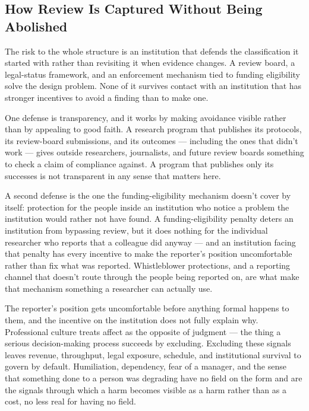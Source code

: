 \subsection{How Review Is Captured Without Being Abolished}
\label{sec:captured-abolished}
The risk to the whole structure is an institution that defends the classification it started with rather than revisiting it when evidence changes. A review board, a legal-status framework, and an enforcement mechanism tied to funding eligibility solve the design problem. None of it survives contact with an institution that has stronger incentives to avoid a finding than to make one.

One defense is transparency, and it works by making avoidance visible rather than by appealing to good faith. A research program that publishes its protocols, its review-board submissions, and its outcomes — including the ones that didn't work — gives outside researchers, journalists, and future review boards something to check a claim of compliance against. A program that publishes only its successes is not transparent in any sense that matters here.

A second defense is the one the funding-eligibility mechanism doesn't cover by itself: protection for the people inside an institution who notice a problem the institution would rather not have found. A funding-eligibility penalty deters an institution from bypassing review, but it does nothing for the individual researcher who reports that a colleague did anyway — and an institution facing that penalty has every incentive to make the reporter's position uncomfortable rather than fix what was reported. Whistleblower protections, and a reporting channel that doesn't route through the people being reported on, are what make that mechanism something a researcher can actually use.

The reporter's position gets uncomfortable before anything formal happens to them, and the incentive on the institution does not fully explain why. Professional culture treats affect as the opposite of judgment — the thing a serious decision-making process succeeds by excluding. Excluding these signals leaves revenue, throughput, legal exposure, schedule, and institutional survival to govern by default. Humiliation, dependency, fear of a manager, and the sense that something done to a person was degrading have no field on the form and are the signals through which a harm becomes visible as a harm rather than as a cost, no less real for having no field.

